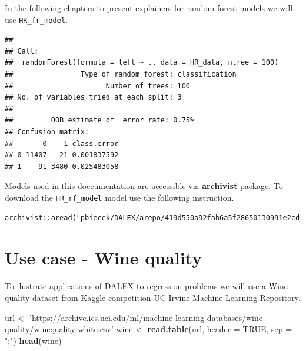 \documentclass[]{book}
\newenvironment{Shaded}{\begin{snugshade}}{\end{snugshade}}
\newcommand{\KeywordTok}[1]{\textcolor[rgb]{0.13,0.29,0.53}{\textbf{#1}}}
\newcommand{\DataTypeTok}[1]{\textcolor[rgb]{0.13,0.29,0.53}{#1}}
\newcommand{\DecValTok}[1]{\textcolor[rgb]{0.00,0.00,0.81}{#1}}
\newcommand{\StringTok}[1]{\textcolor[rgb]{0.31,0.60,0.02}{#1}}
\newcommand{\OtherTok}[1]{\textcolor[rgb]{0.56,0.35,0.01}{#1}}
\newcommand{\OperatorTok}[1]{\textcolor[rgb]{0.81,0.36,0.00}{\textbf{#1}}}
\newcommand{\NormalTok}[1]{#1}
\theoremstyle{definition}
\theoremstyle{definition}
\theoremstyle{definition}
\theoremstyle{remark}
\begin{document}
In the following chapters to present explainers for random forest models
we will use \texttt{HR\_fr\_model}.

\begin{Shaded}
\end{Shaded}

\begin{verbatim}
## 
## Call:
##  randomForest(formula = left ~ ., data = HR_data, ntree = 100) 
##                Type of random forest: classification
##                      Number of trees: 100
## No. of variables tried at each split: 3
## 
##         OOB estimate of  error rate: 0.75%
## Confusion matrix:
##       0    1 class.error
## 0 11407   21 0.001837592
## 1    91 3480 0.025483058
\end{verbatim}

Models used in this doccumentation are accessible via \textbf{archivist}
package. To download the \texttt{HR\_rf\_model} model use the following
instruction.

\begin{verbatim}
archivist::aread("pbiecek/DALEX/arepo/419d550a92fab6a5f28650130991e2cd")
\end{verbatim}

\section{Use case - Wine quality}\label{use-case---wine-quality}

To ilustrate applications of DALEX to regression problems we will use a
Wine quality dataset from Kaggle competition
\href{http://mlr.cs.umass.edu/ml/}{UC Irvine Machine Learning
Repository}.

\begin{Shaded}
\begin{Highlighting}[]
\NormalTok{url <-}\StringTok{ 'https://archive.ics.uci.edu/ml/machine-learning-databases/wine-quality/winequality-white.csv'}
\NormalTok{wine <-}\StringTok{ }\KeywordTok{read.table}\NormalTok{(url, }\DataTypeTok{header =} \OtherTok{TRUE}\NormalTok{, }\DataTypeTok{sep =} \StringTok{";"}\NormalTok{)}
\KeywordTok{head}\NormalTok{(wine)}
\end{Highlighting}
\end{Shaded}
\end{document}
